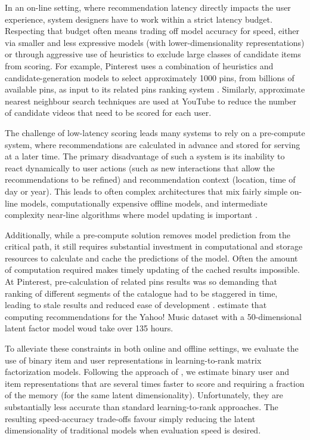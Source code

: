 \documentclass[sigchi]{acmart}
\begin{document}
In an on-line setting, where recommendation latency directly impacts the user experience, system designers have to work within a strict latency budget. Respecting that budget often means trading off model accuracy for speed, either via smaller and less expressive models (with lower-dimensionality representations) or through aggressive use of heuristics to exclude large classes of candidate items from scoring. For example, Pinterest uses a combination of heuristics and candidate-generation models to select approximately 1000 pins, from billions of available pins, as input to its related pins ranking system \citep{liu2017related}. Similarly, approximate nearest neighbour search techniques are used at YouTube \citep{covington2016deep} to reduce the number of candidate videos that need to be scored for each user.

The challenge of low-latency scoring leads many systems to rely on a pre-compute system, where recommendations are calculated in advance and stored for serving at a later time. The primary disadvantage of such a system is its inability to react dynamically to user actions (such as new interactions that allow the recommendations to be refined) and recommendation context (location, time of day or year). This leads to often complex architectures that mix fairly simple on-line models, computationally expensive offline models, and intermediate complexity near-line algorithms where model updating is important \citep{amatriain2013big}.

Additionally, while a pre-compute solution removes model prediction from the critical path, it still requires substantial investment in computational and storage resources to calculate and cache the predictions of the model. Often the amount of computation required makes timely updating of the cached results impossible. At Pinterest, pre-calculation of related pins results was so demanding that ranking of different segments of the catalogue had to be staggered in time, leading to stale results and reduced ease of development \citep[Section 5.5]{liu2017related}. \citet{koenigstein2012efficient} estimate that computing recommendations for the Yahoo! Music dataset \citep{dror2011yahoo} with a 50-dimensional latent factor model woud take over 135 hours.

To alleviate these constraints in both online and offline settings, we evaluate the use of binary item and user representations in learning-to-rank matrix factorization models. Following the approach of \citet{rastegari2016xnor}, we estimate binary user and item representations that are several times faster to score and requiring a fraction of the memory (for the same latent dimensionality). Unfortunately, they are substantially less accurate than standard learning-to-rank approaches. The resulting speed-accuracy trade-offs favour simply reducing the latent dimensionality of traditional models when evaluation speed is desired.
\end{document}
